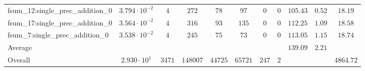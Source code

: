 \begin{tabular}{|l|c|c|c|c|c|c|c|c|c|c|}
fsum\_12:single\_prec\_addition\_0             & $ 3.794 \cdot 10^{-2} $ & $ 4      $ & $ 272    $ & $ 78    $ & $ 97    $ & $ 0   $ & $ 0 $ & $ 105.43      $ & $ 0.52    $ & $ 18.19   $ \\
fsum\_17:single\_prec\_addition\_0             & $ 3.564 \cdot 10^{-2} $ & $ 4      $ & $ 316    $ & $ 93    $ & $ 135   $ & $ 0   $ & $ 0 $ & $ 112.25      $ & $ 1.09    $ & $ 18.58   $ \\
fsum\_7:single\_prec\_addition\_0              & $ 3.538 \cdot 10^{-2} $ & $ 4      $ & $ 245    $ & $ 75    $ & $ 73    $ & $ 0   $ & $ 0 $ & $ 113.05      $ & $ 1.15    $ & $ 18.74   $ \\
\hline
Average                                        & $                     $ & $        $ & $        $ & $       $ & $       $ & $     $ & $   $ & $ 139.09      $ & $ 2.21    $ & $         $ \\
\hline
Overall                                        & $ 2.930 \cdot 10^{1}  $ & $ 3471   $ & $ 148007 $ & $ 44725 $ & $ 65721 $ & $ 247 $ & $ 2 $ & $             $ & $         $ & $ 4864.72 $ \\
\hline
\end{tabular}

